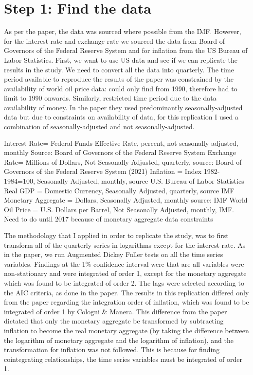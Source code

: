 \documentclass[11pt,preprint, authoryear]{elsarticle}
\numberwithin{equation}{section}
\numberwithin{figure}{section}
\numberwithin{table}{section}
\begin{document}
\hypertarget{step-1-find-the-data}{%
\section{Step 1: Find the data}\label{step-1-find-the-data}}

As per the paper, the data was sourced where possible from the IMF.
However, for the interest rate and exchange rate we sourced the data
from Board of Governors of the Federal Reserve System and for inflation
from the US Bureau of Labor Statistics. First, we want to use US data
and see if we can replicate the results in the study. We need to convert
all the data into quarterly. The time period available to reproduce the
results of the paper was constrained by the availability of world oil
price data: could only find from 1990, therefore had to limit to 1990
onwards. Similarly, restricted time period due to the data availability
of money. In the paper they used predominantly seasonally-adjusted data
but due to constraints on availability of data, for this replication I
used a combination of seasonally-adjusted and not seasonally-adjusted.

Interest Rate= Federal Funds Effective Rate, percent, not seasonally
adjusted, monthly Source: Board of Governors of the Federal Reserve
System Exchange Rate= Millions of Dollars, Not Seasonally Adjusted,
quarterly, source: Board of Governors of the Federal Reserve System
(2021) Inflation = Index 1982-1984=100, Seasonally Adjusted, monthly,
source U.S. Bureau of Labor Statistics Real GDP = Domestic Currency,
Seasonally Adjusted, quarterly, source IMF Monetary Aggregate = Dollars,
Seasonally Adjusted, monthly source: IMF World Oil Price = U.S. Dollars
per Barrel, Not Seasonally Adjusted, monthly, IMF. Need to do until 2017
because of monetary aggregate data constraints

The methodology that I applied in order to replicate the study, was to
first transform all of the quarterly series in logarithms except for the
interest rate. As in the paper, we run Augmented Dickey Fuller tests on
all the time series variables. Findings at the 1\% confidence interval
were that are all variables were non-stationary and were integrated of
order 1, except for the monetary aggregate which was found to be
integrated of order 2. The lags were selected according to the AIC
criteria, as done in the paper. The results in this replication differed
only from the paper regarding the integration order of inflation, which
was found to be integrated of order 1 by Cologni \& Manera. This
difference from the paper dictated that only the monetary aggregate be
transformed by subtracting inflation to become the real monetary
aggregate (by taking the difference between the logarithm of monetary
aggregate and the logarithm of inflation), and the transformation for
inflation was not followed. This is because for finding cointegrating
relationships, the time series variables must be integrated of order 1.
\end{document}

